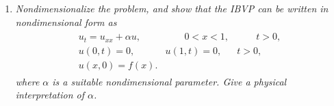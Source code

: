 \documentclass[fontsize=11pt]{article} %
\theoremstyle{plain}
\numberwithin{equation}{section} %
\numberwithin{figure}{section} %
\numberwithin{table}{section} %
\begin{document}
\begin{enumerate}[\bf (a)]
    \item
        \emph{Nondimensionalize the problem, and show that the IBVP can be written in nondimensional form as}
        \begin{align*}
            \begin{array}{rrr}
                u_t = u_{xx} + \alpha u, & \qquad 0 < x < 1, & \qquad t > 0, \\
                u(0, t) = 0, & u(1, t) = 0, & t > 0, \\
                u(x, 0) = f(x). & &
            \end{array}
        \end{align*}
        \emph{where $\alpha$ is a suitable nondimensional parameter.  Give a physical interpretation of $\alpha$.} \\


\end{enumerate}
\end{document}
